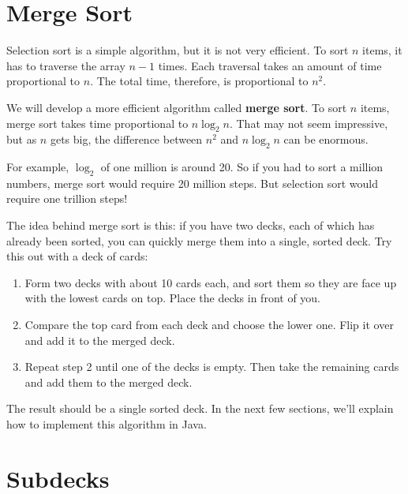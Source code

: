\section{Merge Sort}
\label{mergesort}


Selection sort is a simple algorithm, but it is not very efficient.
To sort $n$ items, it has to traverse the array $n-1$ times.
Each traversal takes an amount of time proportional to $n$.
The total time, therefore, is proportional to $n^2$.


We will develop a more efficient algorithm called {\bf merge sort}.
To sort $n$ items, merge sort takes time proportional to $n \log_2 n$.
That may not seem impressive, but as $n$ gets big, the difference between $n^2$ and $n \log_2 n$ can be enormous.

For example, $\log_2$ of one million is around 20.
So if you had to sort a million numbers, merge sort would require 20 million steps.
But selection sort would require one trillion steps!

The idea behind merge sort is this: if you have two decks, each of which has already been sorted, you can quickly merge them into a single, sorted deck.
Try this out with a deck of cards:

\begin{enumerate}

\item Form two decks with about 10 cards each, and sort them so they are face up with the lowest cards on top.
Place the decks in front of you.

\item Compare the top card from each deck and choose the lower one.
Flip it over and add it to the merged deck.

\item Repeat step 2 until one of the decks is empty.
Then take the remaining cards and add them to the merged deck.

\end{enumerate}

The result should be a single sorted deck.
In the next few sections, we'll explain how to implement this algorithm in Java.


\section{Subdecks}

